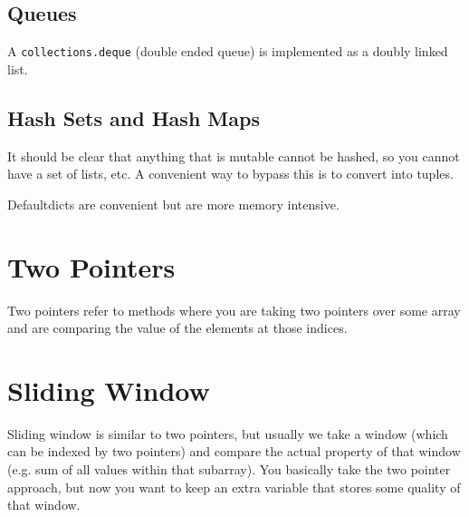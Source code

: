 \documentclass{article}
\begin{document}
  \subsection{Queues} 

    A \texttt{collections.deque} (double ended queue) is implemented as a doubly linked list. 

  \subsection{Hash Sets and Hash Maps} 

    It should be clear that anything that is mutable cannot be hashed, so you cannot have a set of lists, etc. A convenient way to bypass this is to convert into tuples. 

    Defaultdicts are convenient but are more memory intensive. 

\section{Two Pointers}

  Two pointers refer to methods where you are taking two pointers over some array and are comparing the value of the elements at those indices.  

\section{Sliding Window}
  
  Sliding window is similar to two pointers, but usually we take a window (which can be indexed by two pointers) and compare the actual property of that window (e.g. sum of all values within that subarray). You basically take the two pointer approach, but now you want to keep an extra variable that stores some quality of that window. 
\end{document}

